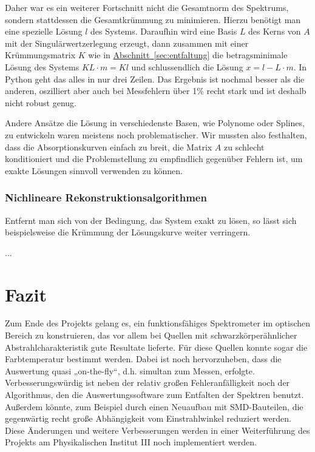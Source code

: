 \documentclass[11pt]{scrartcl}
\newcommand{\hypref}[2]{\hyperref[#2]{{#1}~\ref{#2}}}
\begin{document}
Daher war es ein weiterer Fortschnitt nicht die Gesamtnorm des Spektrums, sondern stattdessen die Gesamtkrümmung zu minimieren.
Hierzu benötigt man eine spezielle Lösung $l$ des Systems.
Daraufhin wird eine Basis $L$ des Kerns von $A$ mit der Singulärwertzerlegung erzeugt, dann zusammen mit einer Krümmungsmatrix $K$ wie in \hypref{Abschnitt}{sec:entfaltung} die betragsminimale Lösung des Systems $KL\cdot m = Kl$ und schlussendlich die Lösung $x = l - L\cdot m$.
In Python geht das alles in nur drei Zeilen.
Das Ergebnis ist nochmal besser als die anderen, oszilliert aber auch bei Messfehlern über 1\% recht stark und ist deshalb nicht robust genug.

Andere Ansätze die Lösung in verschiedenste Basen, wie Polynome oder Splines, zu entwickeln waren meistens noch problematischer.
Wir mussten also festhalten, dass die Absorptionskurven einfach zu breit, die Matrix $A$ zu schlecht konditioniert und die Problemstellung zu empfindlich gegenüber Fehlern ist, um exakte Lösungen sinnvoll verwenden zu können.

\subsubsection{Nichlineare Rekonstruktionsalgorithmen}
Entfernt man sich von der Bedingung, das System exakt zu lösen, so lässt sich beispielsweise die Krümmung der Lösungskurve weiter verringern.

...






\section{Fazit}
Zum Ende des Projekts gelang es, ein funktionsfähiges Spektrometer im optischen Bereich zu konstruieren, das vor allem bei Quellen mit schwarzkörperähnlicher Abstrahlcharakteristik gute Resultate lieferte. Für diese Quellen konnte sogar die Farbtemperatur bestimmt werden. Dabei ist noch hervorzuheben, dass die Auswertung quasi „on-the-fly“, d.h. simultan zum Messen, erfolgte.
Verbesserungswürdig ist neben der relativ großen Fehleranfälligkeit noch der Algorithmus, den die Auswertungssoftware zum Entfalten der Spektren benutzt. Außerdem könnte, zum Beispiel durch einen Neuaufbau mit SMD-Bauteilen, die gegenwärtig recht große Abhängigkeit vom Einstrahlwinkel reduziert werden. Diese Änderungen und weitere Verbesserungen werden in einer Weiterführung des Projekts am Physikalischen Institut III noch implementiert werden.
\end{document}
